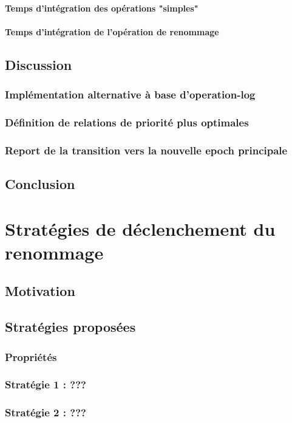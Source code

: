\documentclass[12pt]{thesul}
\begin{document}
\subsubsection{Temps d'intégration des opérations "simples"}
\subsubsection{Temps d'intégration de l'opération de renommage}
\section{Discussion}
\subsection{Implémentation alternative à base d'operation-log}
\subsection{Définition de relations de priorité plus optimales}
\subsection{Report de la transition vers la nouvelle epoch principale}
\section{Conclusion}
% 

\NumberThisInToc
\chapter{Stratégies de déclenchement du renommage}
\minitoc
\section{Motivation}
\section{Stratégies proposées}
\subsection{Propriétés}
\subsection{Stratégie 1 : ???}
\subsection{Stratégie 2 : ???}
\end{document}
